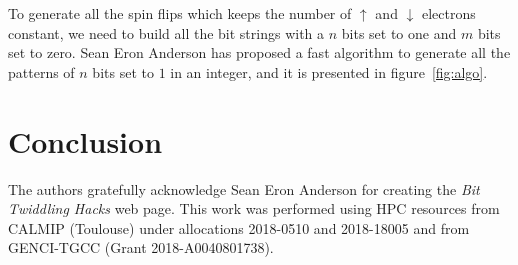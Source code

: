 \documentclass[aip,jcp,reprint,showkeys]{revtex4-1}
\newcommand{\up}{\uparrow}
\newcommand{\dn}{\downarrow}
\begin{document}
To generate all the spin flips which keeps the number of $\up$ and $\dn$
electrons constant, we need to build all the bit strings with a $n$
bits set to one and $m$ bits set to zero.
Sean Eron Anderson\cite{NextBit} has proposed a fast algorithm to generate all
the patterns of $n$ bits set to $1$ in an integer, and it is presented in
figure~\ref{fig:algo}.













\section{Conclusion}


\begin{acknowledgments}
The authors gratefully acknowledge Sean Eron Anderson for creating the 
\emph{Bit Twiddling Hacks} web page.
This work was performed using HPC resources from CALMIP (Toulouse) under
allocations 2018-0510 and 2018-18005 and from GENCI-TGCC (Grant
2018-A0040801738).
\end{acknowledgments}



\end{document}
